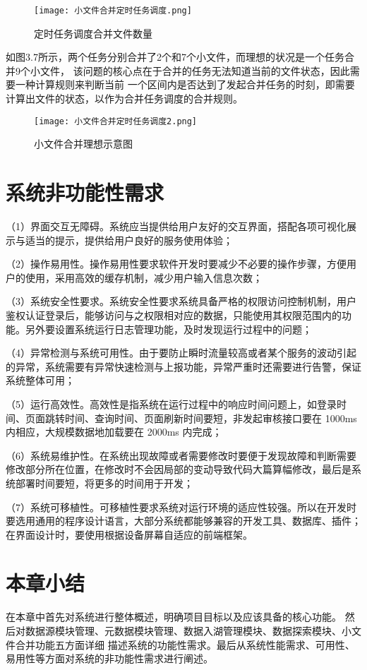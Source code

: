 \begin{figure}[h]
  \centering
  \texttt{[image: 小文件合并定时任务调度.png]}
  \caption{定时任务调度合并文件数量}
  \label{fig:badge}
\end{figure}

如图3.7所示，两个任务分别合并了2个和7个小文件，而理想的状况是一个任务合并9个小文件，
该问题的核心点在于合并的任务无法知道当前的文件状态，因此需要一种计算规则来判断当前
一个区间内是否达到了发起合并任务的时刻，即需要计算出文件的状态，以作为合并任务调度的合并规则。

\begin{figure}[h]
  \centering
  \texttt{[image: 小文件合并定时任务调度2.png]}
  \caption{小文件合并理想示意图}
  \label{fig:badge}
\end{figure}

\section{系统非功能性需求}

（1）界面交互无障碍。系统应当提供给用户友好的交互界面，搭配各项可视化展示与适当的提示，提供给用户良好的服务使用体验；

（2）操作易用性。操作易用性要求软件开发时要减少不必要的操作步骤，方便用户的使用，采用高效的缓存机制，减少用户输入信息次数；

（3）系统安全性要求。系统安全性要求系统具备严格的权限访问控制机制，用户鉴权认证登录后，能够访问与之权限相对应的数据，只能使用其权限范围内的功能。另外要设置系统运行日志管理功能，及时发现运行过程中的问题；

（4）异常检测与系统可用性。由于要防止瞬时流量较高或者某个服务的波动引起的异常，系统需要有异常快速检测与上报功能，异常严重时还需要进行告警，保证系统整体可用；

（5）运行高效性。高效性是指系统在运行过程中的响应时间问题上，如登录时间、页面跳转时间、查询时间、页面刷新时间要短，非发起审核接口要在 1000ms 内相应，大规模数据地加载要在 2000ms 内完成；

（6）系统易维护性。在系统出现故障或者需要修改时要便于发现故障和判断需要修改部分所在位置，在修改时不会因局部的变动导致代码大篇算幅修改，最后是系统部署时间要短，将更多的时间用于开发；

（7）系统可移植性。可移植性要求系统对运行环境的适应性较强。所以在开发时要选用通用的程序设计语言，大部分系统都能够兼容的开发工具、数据库、插件；在界面设计时，要使用根据设备屏幕自适应的前端框架。

\section{本章小结}

在本章中首先对系统进行整体概述，明确项目目标以及应该具备的核心功能。
然后对数据源模块管理、元数据模块管理、数据入湖管理模块、数据探索模块、小文件合并功能五方面详细
描述系统的功能性需求。最后从系统性能需求、可用性、易用性等方面对系统的非功能性需求进行阐述。
